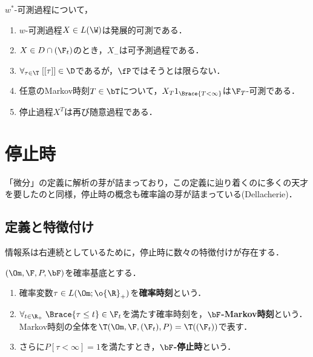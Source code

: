 \documentclass[uplatex,dvipdfmx]{jsreport}
\begin{document}
\begin{corollary}
    $w^*$-可測過程について，
    \begin{enumerate}
        \item $w$-可測過程$X\in L(\W)$は発展的可測である．
        \item $X\in D\cap(\F_t)$のとき，$X_-$は可予測過程である．
        \item $\forall_{\tau\in\T}\;[[\tau]]\in\D$であるが，$\fP$ではそうとは限らない．
        \item 任意のMarkov時刻$T\in\bT$について，$X_T1_{\Brace{T<\infty}}$は$\F_T$-可測である．
        \item 停止過程$X^T$は再び随意過程である．
    \end{enumerate}
\end{corollary}

\section{停止時}

\begin{tcolorbox}[colframe=ForestGreen, colback=ForestGreen!10!white,breakable,colbacktitle=ForestGreen!40!white,coltitle=black,fonttitle=\bfseries\sffamily,
title=]
「微分」の定義に解析の芽が詰まっており，この定義に辿り着くのに多くの天才を要したのと同様，停止時の概念も確率論の芽が詰まっている(Dellacherie\cite{Dellacherie-Meyer-A})．
\end{tcolorbox}

\subsection{定義と特徴付け}

\begin{tcolorbox}[colframe=ForestGreen, colback=ForestGreen!10!white,breakable,colbacktitle=ForestGreen!40!white,coltitle=black,fonttitle=\bfseries\sffamily,
title=]
    情報系は右連続としているために，停止時に数々の特徴付けが存在する．
\end{tcolorbox}

\begin{definition}
    $(\Om,\F,P,\bF)$を確率基底とする．
    \begin{enumerate}
        \item 確率変数$\tau\in L(\Om;\o{\R}_+)$を\textbf{確率時刻}という．
        \item $\forall_{t\in\R_+}\;\Brace{\tau\le t}\in\F_t$を満たす確率時刻を，\textbf{$\bF$-Markov時刻}という．Markov時刻の全体を$\T(\Om,\F,(\F_t),P)=\T((\F_t))$で表す．
        \item さらに$P[\tau<\infty]=1$を満たすとき，\textbf{$\bF$-停止時}という．
    \end{enumerate}
\end{definition}
\end{document}
